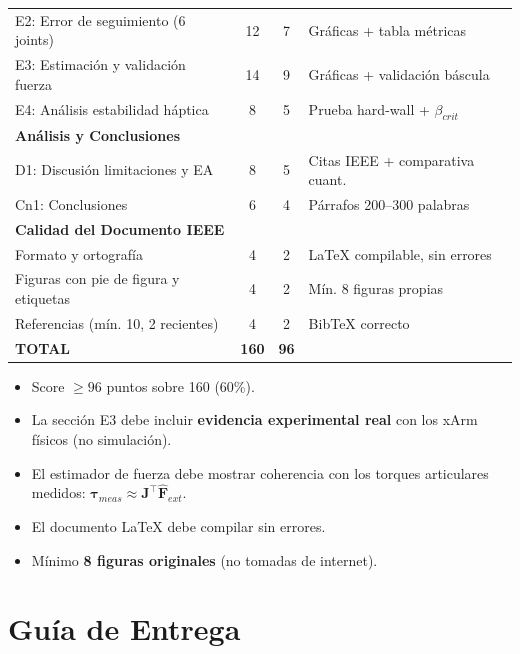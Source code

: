 \documentclass[journal,10pt,twoside]{IEEEtran}
\begin{document}
\begin{center}
\begin{tabular}{p{}ccp{}}
  E2: Error de seguimiento (6 joints)  & 12 & 7 & Gráficas + tabla métricas \\
  E3: Estimación y validación fuerza   & 14 & 9 & Gráficas + validación báscula \\
  E4: Análisis estabilidad háptica     & 8 & 5 & Prueba hard-wall + $\beta_{crit}$ \\
  \midrule
  \multicolumn{4}{l}{\textbf{Análisis y Conclusiones}} \\
  D1: Discusión limitaciones y EA     & 8 & 5 & Citas IEEE + comparativa cuant. \\
  Cn1: Conclusiones                   & 6 & 4 & Párrafos 200--300 palabras \\
  \midrule
  \multicolumn{4}{l}{\textbf{Calidad del Documento IEEE}} \\
  Formato y ortografía                & 4 & 2 & LaTeX compilable, sin errores \\
  Figuras con pie de figura y etiquetas & 4 & 2 & Mín. 8 figuras propias \\
  Referencias (mín. 10, 2 recientes)  & 4 & 2 & BibTeX correcto \\
  \midrule
  \rowcolor{tec_blue!15}
  \textbf{TOTAL} & \textbf{160} & \textbf{96} & \\
  \bottomrule
\end{tabular}
\end{center}

\begin{rubricbox}
  \begin{itemize}[itemsep=0.2em]
    \item Score $\geq 96$ puntos sobre 160 (60\%).
    \item La sección E3 debe incluir \textbf{evidencia experimental real}
          con los xArm físicos (no simulación).
    \item El estimador de fuerza debe mostrar coherencia con los torques
          articulares medidos: $\bm{\tau}_{meas} \approx \bm{J}^\top \hat{\bm{F}}_{ext}$.
    \item El documento LaTeX debe compilar sin errores.
    \item Mínimo \textbf{8 figuras originales} (no tomadas de internet).
  \end{itemize}
\end{rubricbox}

\section{Guía de Entrega}
\label{app:entrega}
\end{document}
